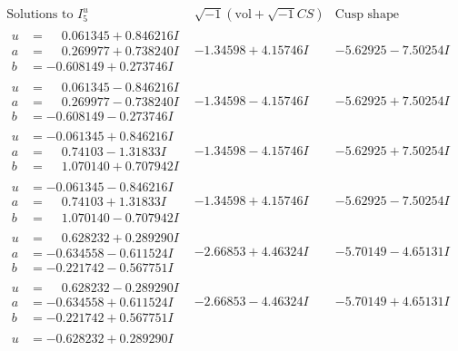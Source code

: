 \documentclass[1p]{elsarticle_modified}
\theoremstyle{definition}
\newcommand{\I}{\sqrt{-1}}
\begin{document}
$$\begin{array}{c|c|c}  
\text{Solutions to }I^u_{5}& \I (\text{vol} + \sqrt{-1}CS) & \text{Cusp shape}\\
 \hline 
\begin{aligned}
u &= \phantom{-}0.061345 + 0.846216 I \\
a &= \phantom{-}0.269977 + 0.738240 I \\
b &= -0.608149 + 0.273746 I\end{aligned}
 & -1.34598 + 4.15746 I & -5.62925 - 7.50254 I \\ \hline\begin{aligned}
u &= \phantom{-}0.061345 - 0.846216 I \\
a &= \phantom{-}0.269977 - 0.738240 I \\
b &= -0.608149 - 0.273746 I\end{aligned}
 & -1.34598 - 4.15746 I & -5.62925 + 7.50254 I \\ \hline\begin{aligned}
u &= -0.061345 + 0.846216 I \\
a &= \phantom{-}0.74103 - 1.31833 I \\
b &= \phantom{-}1.070140 + 0.707942 I\end{aligned}
 & -1.34598 - 4.15746 I & -5.62925 + 7.50254 I \\ \hline\begin{aligned}
u &= -0.061345 - 0.846216 I \\
a &= \phantom{-}0.74103 + 1.31833 I \\
b &= \phantom{-}1.070140 - 0.707942 I\end{aligned}
 & -1.34598 + 4.15746 I & -5.62925 - 7.50254 I \\ \hline\begin{aligned}
u &= \phantom{-}0.628232 + 0.289290 I \\
a &= -0.634558 - 0.611524 I \\
b &= -0.221742 - 0.567751 I\end{aligned}
 & -2.66853 + 4.46324 I & -5.70149 - 4.65131 I \\ \hline\begin{aligned}
u &= \phantom{-}0.628232 - 0.289290 I \\
a &= -0.634558 + 0.611524 I \\
b &= -0.221742 + 0.567751 I\end{aligned}
 & -2.66853 - 4.46324 I & -5.70149 + 4.65131 I \\ \hline\begin{aligned}
u &= -0.628232 + 0.289290 I \\

\end{aligned}
\end{array}$$
\end{document}

